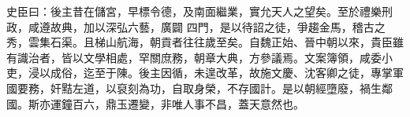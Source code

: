 \begin{pinyinscope}
 史臣曰：後主昔在儲宮，早標令德，及南面繼業，實允天人之望矣。至於禮樂刑政，咸遵故典，加以深弘六藝，廣闢
 四門，是以待詔之徒，爭趨金馬，稽古之秀，雲集石渠。且梯山航海，朝貢者往往歲至矣。自魏正始、晉中朝以來，貴臣雖有識治者，皆以文學相處，罕關庶務，朝章大典，方參議焉。文案簿領，咸委小吏，浸以成俗，迄至于陳。後主因循，未遑改革，故施文慶、沈客卿之徒，專掌軍國要務，奸黠左道，以裒刻為功，自取身榮，不存國計。是以朝經墮廢，禍生鄰國。斯亦運鐘百六，鼎玉遷變，非唯人事不昌，蓋天意然也。



\end{pinyinscope}
